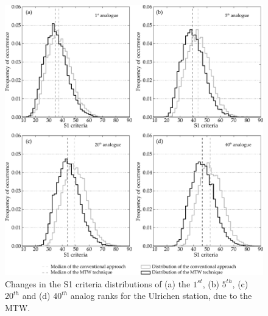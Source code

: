 \documentclass[hess, manuscript]{copernicus}
\begin{document}
\begin{figure}[htb]
	\begin{center}
		\includegraphics[width=15cm]{figures/changes_S1_analogues.pdf}
	\end{center}
	\caption{Changes in the S1 criteria distributions of (a) the $1^{st}$, (b) $5^{th}$, (c) $20^{th}$ and (d) $40^{th}$ analog ranks for the Ulrichen station, due to the MTW.}
	\label{fig:changes_S1_analogs}
\end{figure}
\end{document}
